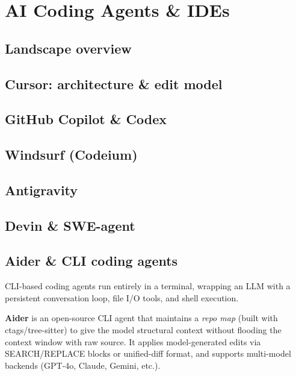 
\section{AI Coding Agents \& IDEs}

\subsection{Landscape overview}


\subsection{Cursor: architecture \& edit model}


\subsection{GitHub Copilot \& Codex}


\subsection{Windsurf (Codeium)}


\subsection{Antigravity}


\subsection{Devin \& SWE-agent}


\subsection{Aider \& CLI coding agents}

CLI-based coding agents run entirely in a terminal, wrapping an LLM with a persistent
conversation loop, file I/O tools, and shell execution.

\textbf{Aider} is an open-source CLI agent that maintains a \emph{repo map} (built with
ctags/tree-sitter) to give the model structural context without flooding the context window
with raw source. It applies model-generated edits via SEARCH/REPLACE blocks or unified-diff
format, and supports multi-model backends (GPT-4o, Claude, Gemini, etc.).

